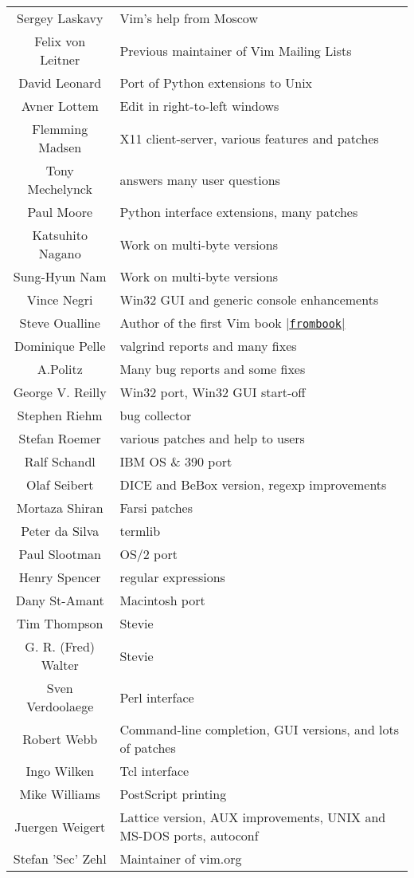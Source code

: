 \begin{longtable}{c l}
				Sergey Laskavy & Vim's help from Moscow\\
				Felix von Leitner & Previous maintainer of Vim Mailing Lists\\
				David Leonard & Port of Python extensions to Unix\\
				Avner Lottem & Edit in right-to-left windows\\
				Flemming Madsen & X11 client-server, various features and patches\\
				Tony Mechelynck & answers many user questions\\
				Paul Moore & Python interface extensions, many patches\\
				Katsuhito Nagano & Work on multi-byte versions\\
				Sung-Hyun Nam & Work on multi-byte versions\\
				Vince Negri & Win32 GUI and generic console enhancements\\
				Steve Oualline & Author of the first Vim book \hyperref[frombook]{|\texttt{frombook}|}\\
				Dominique Pelle & valgrind reports and many fixes\\
				A.Politz & Many bug reports and some fixes\\
				George V. Reilly & Win32 port, Win32 GUI start-off\\
				Stephen Riehm & bug collector\\
				Stefan Roemer & various patches and help to users\\
				Ralf Schandl & IBM OS \& 390 port\\
				Olaf Seibert & DICE and BeBox version, regexp improvements\\
				Mortaza Shiran & Farsi patches\\
				Peter da Silva & termlib\\
				Paul Slootman & OS/2 port\\
				Henry Spencer & regular expressions\\
				Dany St-Amant & Macintosh port\\
				Tim Thompson & Stevie\\
				G. R. (Fred) Walter & Stevie\\
				Sven Verdoolaege & Perl interface\\
				Robert Webb & Command-line completion, GUI versions, and lots of patches\\
				Ingo Wilken & Tcl interface\\
				Mike Williams & PostScript printing\\
				Juergen Weigert & Lattice version, AUX improvements, UNIX and MS-DOS ports, autoconf\\
				Stefan 'Sec' Zehl & Maintainer of vim.org\\
\end{longtable}


